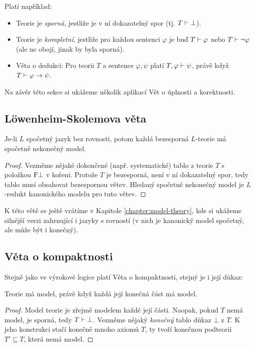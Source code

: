 Platí například:
\begin{itemize}
    \item Teorie je \emph{sporná}, jestliže je v ní dokazatelný spor (tj. $T\vdash\bot$).
    \item Teorie je \emph{kompletní}, jestliže pro každou sentenci $\varphi$ je buď $T\vdash\varphi$ nebo $T\vdash\neg\varphi$ (ale ne obojí, jinak by byla sporná).
    \item Věta o dedukci: Pro teorii $T$ a sentence $\varphi,\psi$ platí $T,\varphi\vdash\psi$, právě když $T\vdash\varphi\to\psi$.
\end{itemize}

Na závěr této sekce si ukážeme několik aplikací Vět o úplnosti a korektnosti.

\subsection{Löwenheim-Skolemova věta}\label{subsection:loewenheim-skolem-theorem}

\begin{theorem}
    Je-li $L$ spočetný jazyk bez rovnosti, potom každá bezesporná $L$-teorie má spočetně nekonečný model.
\end{theorem}

\begin{proof}
Vezměme nějaké dokončené (např. systematické) tablo z teorie $T$ s položkou $\mathrm{F}\bot$ v kořeni. Protože $T$ je bezesporná, není v ní dokazatelný spor, tedy tablo musí obsahovat bezespornou větev. Hledaný spočetně nekonečný model je $L$-redukt kanonického modelu pro tuto větev.
\end{proof}

K této větě se ještě vrátíme v Kapitole \ref{chapter:model-theory}, kde si ukážeme silnější verzi zahrnující i jazyky s rovností (v nich je kanonický model spočetný, ale může být i konečný).

\subsection{Věta o kompaktnosti}

Stejně jako ve výrokové logice platí Věta o kompaktnosti, stejný je i její důkaz:

\begin{theorem}[O kompaktnosti]\label{theorem:compactness-theorem-predicate}
    Teorie má model, právě když každá její konečná část má model.    
\end{theorem}
\begin{proof}
Model teorie je zřejmě modelem každé její části. Naopak, pokud $T$ nemá model, je sporná, tedy $T\vdash\bot$. Vezměme nějaký \emph{konečný} tablo důkaz $\bot$ z $T$. K jeho konstrukci stačí konečně mnoho axiomů $T$, ty tvoří konečnou podteorii $T'\subseteq T$, která nemá model.
\end{proof}


